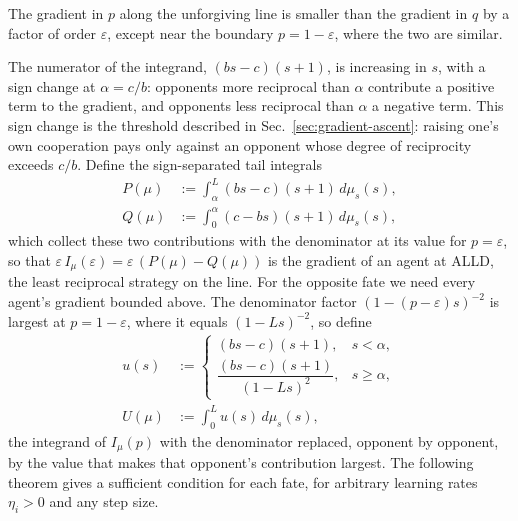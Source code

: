 \documentclass[10pt]{article}
\newcommand{\eps}{\varepsilon}
\begin{document}
The gradient in $p$ along the unforgiving line is smaller than the gradient in $q$ by a factor of order $\eps$, except near the boundary $p = 1-\eps$, where the two are similar.

The numerator of the integrand, $(bs-c)(s+1)$, is increasing in $s$, with a sign change at $\alpha = c/b$: opponents more reciprocal than $\alpha$ contribute a positive term to the gradient, and opponents less reciprocal than $\alpha$ a negative term. This sign change is the threshold described in Sec.~\ref{sec:gradient-ascent}: raising one's own cooperation pays only against an opponent whose degree of reciprocity exceeds $c/b$. Define the sign-separated tail integrals
\begin{align*}
P(\mu) &:= \int_\alpha^L (bs-c)(s+1)\, d\mu_s(s), \\
Q(\mu) &:= \int_0^\alpha (c-bs)(s+1)\, d\mu_s(s),
\end{align*}
which collect these two contributions with the denominator at its value for $p = \eps$, so that $\eps\, I_\mu(\eps) = \eps\,(P(\mu) - Q(\mu))$ is the gradient of an agent at ALLD, the least reciprocal strategy on the line. For the opposite fate we need every agent's gradient bounded above. The denominator factor $(1-(p-\eps)s)^{-2}$ is largest at $p = 1-\eps$, where it equals $(1-Ls)^{-2}$, so define
\begin{align*}
u(s) &:= \begin{cases} (bs-c)(s+1), & s < \alpha,\\[3pt] \dfrac{(bs-c)(s+1)}{(1-Ls)^2}, & s \ge \alpha, \end{cases} \\
U(\mu) &:= \int_0^L u(s)\, d\mu_s(s),
\end{align*}
the integrand of $I_\mu(p)$ with the denominator replaced, opponent by opponent, by the value that makes that opponent's contribution largest. The following theorem gives a sufficient condition for each fate, for arbitrary learning rates $\eta_i > 0$ and any step size.
\end{document}
